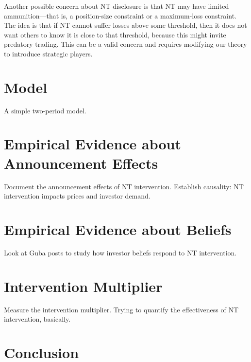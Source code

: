 \documentclass[12pt]{article}
\begin{document}
Another possible concern about NT disclosure is that NT may have limited ammunition---that is, a position-size constraint or a maximum-loss constraint. The idea is that if NT cannot suffer losses above some threshold, then it does not want others to know it is close to that threshold, because this might invite predatory trading. This can be a valid concern and requires modifying our theory to introduce strategic players.


\section{Model}
\label{sec:model}
A simple two-period model.

\section{Empirical Evidence about Announcement Effects}
\label{sec:announcements}
Document the announcement effects of NT intervention. Establish causality: NT intervention impacts prices and investor demand. 

\section{Empirical Evidence about Beliefs}
\label{sec:beliefs}
Look at Guba posts to study how investor beliefs respond to NT intervention. 

\section{Intervention Multiplier}
\label{sec:multiplier}
Measure the intervention multiplier. Trying to quantify the effectiveness of NT intervention, basically. 

\section{Conclusion}
\label{sec:conclusion}


\clearpage



\processdelayedfloats

\newpage
\appendix

    
\setcounter{figure}{0}
\setcounter{table}{0}
\renewcommand{\thetable}{\Alph{section}\arabic{table}}
\renewcommand{\thefigure}{\Alph{section}\arabic{figure}}



\processdelayedfloats
\end{document}
